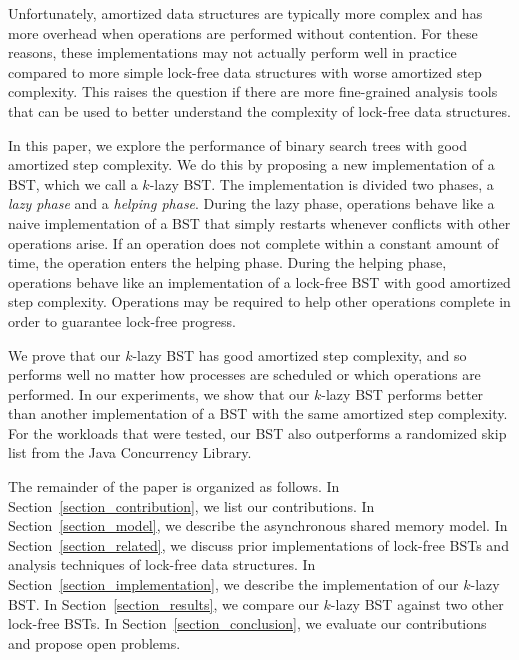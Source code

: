 \documentclass[letterpaper,twocolumn]{article}
\begin{document}
Unfortunately, amortized data structures are typically more complex and has more overhead when operations are performed without contention. For these reasons, these implementations may not actually perform well in practice compared to more simple lock-free data structures with worse amortized step complexity. This raises the question if there are more fine-grained analysis tools that can be used to better understand the complexity of lock-free data structures.

In this paper, we explore the performance of binary search trees with good amortized step complexity. We do this by proposing a new implementation of a BST, which we call a $k$-lazy BST. The implementation is divided two phases, a \textit{lazy phase} and a \textit{helping phase}. During the lazy phase, operations behave like a naive implementation of a BST that simply restarts whenever conflicts with other operations arise. If an operation does not complete within a constant amount of time, the operation enters the helping phase. During the helping phase, operations behave like an implementation of a lock-free BST with good amortized step complexity. Operations may be required to help other operations complete in order to guarantee lock-free progress. 

We prove that our $k$-lazy BST has good amortized step complexity, and so performs well no matter how processes are scheduled or which operations are performed. In our experiments, we show that our $k$-lazy BST performs better than another implementation of a BST with the same amortized step complexity. For the workloads that were tested, our BST also outperforms a randomized skip list from the Java Concurrency Library.

The remainder of the paper is organized as follows. In Section~\ref{section_contribution}, we list our contributions. In Section~\ref{section_model}, we describe the asynchronous shared memory model. In Section~\ref{section_related}, we discuss prior implementations of lock-free BSTs and analysis techniques of lock-free data structures. In Section~\ref{section_implementation}, we describe the implementation of our $k$-lazy BST. In Section~\ref{section_results}, we compare our $k$-lazy BST against two other lock-free BSTs. In Section~\ref{section_conclusion}, we evaluate our contributions and propose open problems.
\end{document}
